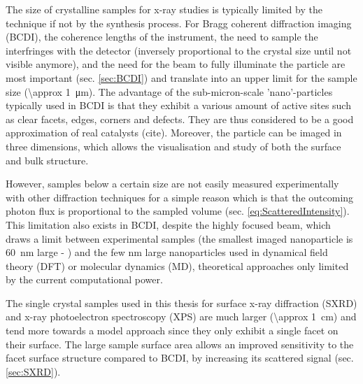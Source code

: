 The size of crystalline samples for x-ray studies is typically limited by the technique if not by the synthesis process.
For Bragg coherent diffraction imaging (BCDI), the coherence lengths of the instrument, the need to sample the interfringes with the detector (inversely proportional to the crystal size until not visible anymore), and the need for the beam to fully illuminate the particle are most important (sec. \ref{sec:BCDI}) and translate into an upper limit for the sample size (\qty{\approx 1}{\um}).
The advantage of the sub-micron-scale 'nano'-particles typically used in BCDI is that they exhibit a various amount of active sites such as clear facets, edges, corners and defects.
They are thus considered to be a good approximation of real catalysts (cite).
Moreover, the particle can be imaged in three dimensions, which allows the visualisation and study of both the surface and bulk structure.

However, samples below a certain size are not easily measured experimentally with other diffraction techniques for a simple reason which is that the outcoming photon flux is proportional to the sampled volume (sec. \ref{eq:ScatteredIntensity}).
This limitation also exists in BCDI, despite the highly focused beam, which draws a limit between experimental samples (the smallest imaged nanoparticle is \qty{60}{\nm} large - \cite{Bjorling2019, Carnis2021}) and the few \unit{\nm} large nanoparticles used in dynamical field theory (DFT) or molecular dynamics (MD), theoretical approaches only limited by the current computational power.

The single crystal samples used in this thesis for surface x-ray diffraction (SXRD) and x-ray photoelectron spectroscopy (XPS) are much larger (\qty{\approx 1}{\cm}) and tend more towards a model approach since they only exhibit a single facet on their surface.
The large sample surface area allows an improved sensitivity to the facet surface structure compared to BCDI, by increasing its scattered signal (sec. \ref{sec:SXRD}).



